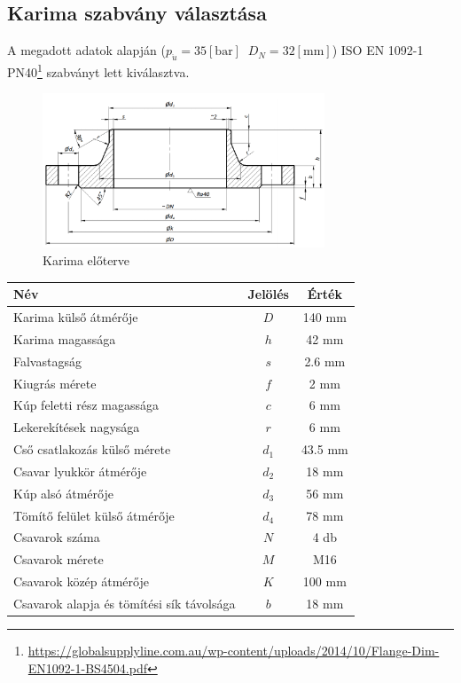 \documentclass[10pt, a4paper]{article}
\newcommand{\baar}{\mathrm{\left[bar\right]}}
\newcommand{\mm}{\mathrm{\left[mm\right]}}
\begin{document}
	\subsection{Karima szabvány választása}
	A megadott adatok alapján ($p_{\ddot{u}} = 35\baar\;\;D_N = 32\mm$) ISO EN 1092-1 PN40\footnote{\url{https://globalsupplyline.com.au/wp-content/uploads/2014/10/Flange-Dim-EN1092-1-BS4504.pdf}} szabványt lett kiválasztva.
	\begin{figure}[h]
		\centering
		\includegraphics[width=0.75\textwidth]{ karima_eloterv.png }
		\caption{Karima előterve}
		\label{fig:karima}
	\end{figure}
	\renewcommand{\arraystretch}{1.4}
	\begin{table}[h]
		\centering
		\begin{tabular}{l|c|c}
			\textbf{Név}                              & \textbf{Jelölés} & \textbf{Érték} \\ \hline
			Karima külső átmérője                     & $D$ & 140 mm \\ 
			Karima magassága                          & $h$ & 42 mm \\ 
			Falvastagság                              & $s$ & 2.6 mm \\ 
			Kiugrás mérete                            & $f$ & 2 mm \\ 
			Kúp feletti rész magassága                & $c$                & 6 mm \\ 
			Lekerekítések nagysága                    & $r$                & 6 mm \\ 
			Cső csatlakozás külső mérete              & $d_1$             & 43.5 mm \\ 
			Csavar lyukkör átmérője                   & $d_2$             & 18 mm \\ 
			Kúp alsó átmérője                         & $d_3$             & 56 mm \\ 
			Tömítő felület külső átmérője             & $d_4$             & 78 mm \\ 
			Csavarok száma                            & $N$                & 4 db \\ 
			Csavarok mérete                           & $M$                & M16 \\ 
			Csavarok közép átmérője                   & $K$                & 100 mm \\ 
			Csavarok alapja és tömítési sík távolsága & $b$                & 18 mm \\ 
		\end{tabular}
	\end{table}
	\renewcommand{\arraystretch}{1}
\end{document}
